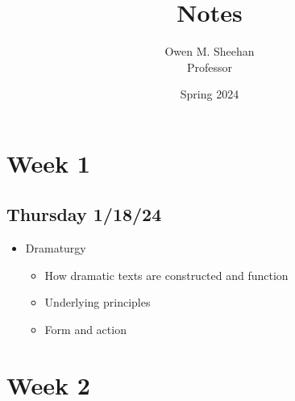 \documentclass[12pt]{article}
\title{\class{} Notes}
\author{Owen M. Sheehan\\Professor \prof{}}
\date{Spring 2024}
\begin{document}
\maketitle
\tableofcontents
\newpage

    \section{Week 1}
        \subsection{Thursday 1/18/24}
        \bigskip
            \begin{itemize}
                \item Dramaturgy
                \begin{itemize}
                    \item How dramatic texts are constructed and function
                    \item Underlying principles
                    \item Form and action
                \end{itemize}
            \end{itemize}
    \section{Week 2}
\end{document}

